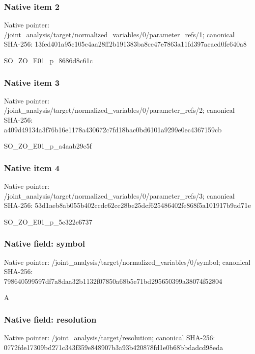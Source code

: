 \documentclass[10pt,a4paper]{article}
\begin{document}
\subsubsection{Native item 2}
Native pointer: /joint\_\allowbreak{}analysis/target/normalized\_\allowbreak{}variables/0/parameter\_\allowbreak{}refs/1; canonical SHA-256: 13fed401a95c105e4aa28ff2b191383ba8ce47e7863a11fd397acacd0fc640a8

\begingroup\raggedright\sloppy SO\_\allowbreak{}ZO\_\allowbreak{}E01\_\allowbreak{}p\_\allowbreak{}8686d8c61c\par\endgroup

\subsubsection{Native item 3}
Native pointer: /joint\_\allowbreak{}analysis/target/normalized\_\allowbreak{}variables/0/parameter\_\allowbreak{}refs/2; canonical SHA-256: a409d49134a3f76b16e1178a430672c7fd18bac0bd6101a9299e0ec4367159cb

\begingroup\raggedright\sloppy SO\_\allowbreak{}ZO\_\allowbreak{}E01\_\allowbreak{}p\_\allowbreak{}a4aab29c5f\par\endgroup

\subsubsection{Native item 4}
Native pointer: /joint\_\allowbreak{}analysis/target/normalized\_\allowbreak{}variables/0/parameter\_\allowbreak{}refs/3; canonical SHA-256: 53d1aeb8ab055b402ccdc62cc28be25dcf625486402fe868f5a101917b9ad71e

\begingroup\raggedright\sloppy SO\_\allowbreak{}ZO\_\allowbreak{}E01\_\allowbreak{}p\_\allowbreak{}5c322c6737\par\endgroup

\subsubsection{Native field: symbol}
Native pointer: /joint\_\allowbreak{}analysis/target/normalized\_\allowbreak{}variables/0/symbol; canonical SHA-256: 798640599597df7a8daa32b1132f07850a68b5e71bd295650399a38074f52804

\begingroup\raggedright\sloppy A\par\endgroup

\subsubsection{Native field: resolution}
Native pointer: /joint\_\allowbreak{}analysis/target/resolution; canonical SHA-256: 0772fde17309bd271c343f359e848907b3a93b420878fd1e0b68bbdadcd98eda
\end{document}
